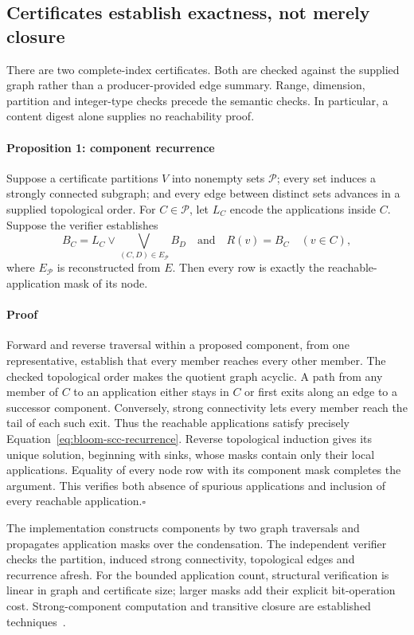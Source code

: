 \subsection{Certificates establish exactness, not merely closure}
\label{sec:bloom-certificates}

There are two complete-index certificates. Both are checked against the supplied graph rather than a producer-provided edge summary. Range, dimension, partition and integer-type checks precede the semantic checks. In particular, a content digest alone supplies no reachability proof.

\paragraph{Proposition 1: component recurrence}
Suppose a certificate partitions $V$ into nonempty sets $\mathcal{P}$; every set induces a strongly connected subgraph; and every edge between distinct sets advances in a supplied topological order. For $C\in\mathcal{P}$, let $L_C$ encode the applications inside $C$. Suppose the verifier establishes
\begin{equation}
 B_C=L_C\mathbin{\lor}\bigvee_{(C,D)\in E_{\mathcal P}}B_D
 \quad\text{and}\quad R(v)=B_C\quad(v\in C),
 \label{eq:bloom-scc-recurrence}
\end{equation}
where $E_{\mathcal P}$ is reconstructed from $E$. Then every row is exactly the reachable-application mask of its node.

\paragraph{Proof}
Forward and reverse traversal within a proposed component, from one representative, establish that every member reaches every other member. The checked topological order makes the quotient graph acyclic. A path from any member of $C$ to an application either stays in $C$ or first exits along an edge to a successor component. Conversely, strong connectivity lets every member reach the tail of each such exit. Thus the reachable applications satisfy precisely Equation~\ref{eq:bloom-scc-recurrence}. Reverse topological induction gives its unique solution, beginning with sinks, whose masks contain only their local applications. Equality of every node row with its component mask completes the argument. This verifies both absence of spurious applications and inclusion of every reachable application.\hfill$\square$

The implementation constructs components by two graph traversals and propagates application masks over the condensation. The independent verifier checks the partition, induced strong connectivity, topological edges and recurrence afresh. For the bounded application count, structural verification is linear in graph and certificate size; larger masks add their explicit bit-operation cost. Strong-component computation and transitive closure are established techniques~\cite{tarjan1972dfs,warshall1962boolean}.

